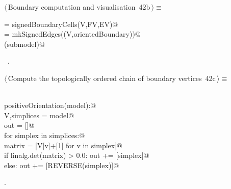 \documentclass[11pt,oneside]{article}	%
\begin{document}
\begin{flushleft} \small \label{scrap90}
\protect{}$\langle\,$Boundary computation and visualisation\nobreak\ {\footnotesize 42b}$\,\rangle\equiv$
\vspace{-1ex}
\begin{list}{}{} \item
\mbox{}\verb@orientedBoundary = signedBoundaryCells(V,FV,EV)@\\
\mbox{}\verb@submodel = mkSignedEdges((V,orientedBoundary))@\\
\mbox{}\verb@VIEW(submodel)@\\
\mbox{}\verb@@{\NWsep}
\end{list}
\vspace{-1ex}
\footnotesize\addtolength{\baselineskip}{-1ex}
\begin{list}{}{\setlength{\itemsep}{-\parsep}\setlength{\itemindent}{-\leftmargin}}
\item \NWtxtMacroRefIn\ .
\end{list}
\end{flushleft}

\begin{flushleft} \small \label{scrap91}
\protect{}$\langle\,$Compute the topologically ordered chain of boundary vertices\nobreak\ {\footnotesize 42c}$\,\rangle\equiv$
\vspace{-1ex}
\begin{list}{}{} \item
\mbox{}\verb@@\\
\mbox{}\verb@def positiveOrientation(model):@\\
\mbox{}\verb@   V,simplices = model@\\
\mbox{}\verb@   out = []@\\
\mbox{}\verb@   for simplex in simplices:@\\
\mbox{}\verb@      matrix = [V[v]+[1] for v in simplex]@\\
\mbox{}\verb@      if linalg.det(matrix) > 0.0:  out += [simplex]@\\
\mbox{}\verb@      else: out += [REVERSE(simplex)]@\\
\mbox{}\verb@@{\NWsep}
\end{list}
\vspace{-1ex}
\footnotesize\addtolength{\baselineskip}{-1ex}
\begin{list}{}{\setlength{\itemsep}{-\parsep}\setlength{\itemindent}{-\leftmargin}}
\item {\NWtxtMacroNoRef}.
\end{list}
\end{flushleft}
\end{document}
